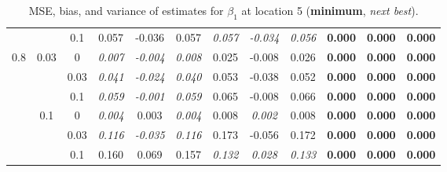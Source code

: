 \documentclass[authoryear, review, 11pt]{elsarticle}
\begin{document}
\begin{table}[ht]
\begin{center}
\begin{tabular}{ccc | ccc | ccc | ccc }
		 &  & 0.1 &   0.057 & -0.036 & 0.057 & \emph{0.057} & \emph{-0.034} & \emph{0.056} & \textbf{0.000} & \textbf{0.000} & \textbf{0.000} \\ \cline{1-12}
		\multirow{6}{*}{0.8} & \multirow{3}{*}{0.03} & 0 &   \emph{0.007} & \emph{-0.004} & \emph{0.008} & 0.025 & -0.008 & 0.026 & \textbf{0.000} & \textbf{0.000} & \textbf{0.000} \\ 
		 &  & 0.03 &   \emph{0.041} & \emph{-0.024} & \emph{0.040} & 0.053 & -0.038 & 0.052 & \textbf{0.000} & \textbf{0.000} & \textbf{0.000} \\ 
		 &  & 0.1 &   \emph{0.059} & \emph{-0.001} & \emph{0.059} & 0.065 & -0.008 & 0.066 & \textbf{0.000} & \textbf{0.000} & \textbf{0.000} \\ \cline{2-12}
		 & \multirow{3}{*}{0.1} & 0 &   \emph{0.004} & 0.003 & \emph{0.004} & 0.008 & \emph{0.002} & 0.008 & \textbf{0.000} & \textbf{0.000} & \textbf{0.000} \\ 
		 &  & 0.03 &   \emph{0.116} & \emph{-0.035} & \emph{0.116} & 0.173 & -0.056 & 0.172 & \textbf{0.000} & \textbf{0.000} & \textbf{0.000} \\ 
		 &  & 0.1 &   0.160 & 0.069 & 0.157 & \emph{0.132} & \emph{0.028} & \emph{0.133} & \textbf{0.000} & \textbf{0.000} & \textbf{0.000} \\ 
		  \end{tabular}
		\caption{MSE, bias, and variance of estimates for $\beta_1$ at location 5 (\textbf{minimum}, \emph{next best}).\label{table:loc5-estimation}}
		\end{center}
		\end{table}




	
	
\end{document}
